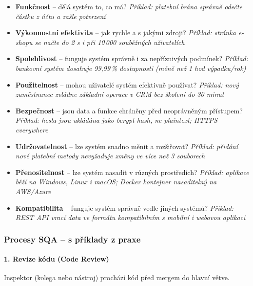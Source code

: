 \begin{itemize}
  \item \textbf{Funkčnost} -- dělá systém to, co má?
    \newline\textit{Příklad: platební brána správně odečte částku z účtu a zašle potvrzení}
  \item \textbf{Výkonnostní efektivita} -- jak rychle a s jakými zdroji?
    \newline\textit{Příklad: stránka e-shopu se načte do 2 s i při 10\,000 souběžných uživatelích}
  \item \textbf{Spolehlivost} -- funguje systém správně i za nepříznivých podmínek?
    \newline\textit{Příklad: bankovní systém dosahuje 99{,}99\,\% dostupnosti (méně než 1 hod výpadku/rok)}
  \item \textbf{Použitelnost} -- mohou uživatelé systém efektivně používat?
    \newline\textit{Příklad: nový zaměstnanec zvládne základní operace v CRM bez školení do 30 minut}
  \item \textbf{Bezpečnost} -- jsou data a funkce chráněny před neoprávněným přístupem?
    \newline\textit{Příklad: hesla jsou ukládána jako bcrypt hash, ne plaintext; HTTPS everywhere}
  \item \textbf{Udržovatelnost} -- lze systém snadno měnit a rozšiřovat?
    \newline\textit{Příklad: přidání nové platební metody nevyžaduje změny ve více než 3 souborech}
  \item \textbf{Přenositelnost} -- lze systém nasadit v různých prostředích?
    \newline\textit{Příklad: aplikace běží na Windows, Linux i macOS; Docker kontejner nasaditelný na AWS/Azure}
  \item \textbf{Kompatibilita} -- funguje systém správně vedle jiných systémů?
    \newline\textit{Příklad: REST API vrací data ve formátu kompatibilním s mobilní i webovou aplikací}
\end{itemize}

\subsubsection{Procesy SQA -- s příklady z praxe}

\paragraph{1. Revize kódu (Code Review)}
Inspektor (kolega nebo nástroj) prochází kód před mergem do hlavní větve.

